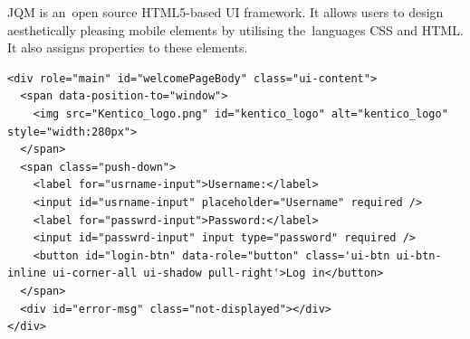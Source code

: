 JQM is an~open source HTML5-based UI framework. It allows users to design aesthetically pleasing mobile elements by utilising the~languages CSS and HTML. It also assigns properties to these elements. 
\lstset{style=sharpc, numbers=left}
\begin{lstlisting}
<div role="main" id="welcomePageBody" class="ui-content">
  <span data-position-to="window">
    <img src="Kentico_logo.png" id="kentico_logo" alt="kentico_logo" style="width:280px">
  </span>
  <span class="push-down">
    <label for="usrname-input">Username:</label>
    <input id="usrname-input" placeholder="Username" required />
    <label for="passwrd-input">Password:</label>
    <input id="passwrd-input" input type="password" required />
    <button id="login-btn" data-role="button" class='ui-btn ui-btn-inline ui-corner-all ui-shadow pull-right'>Log in</button>
  </span>
  <div id="error-msg" class="not-displayed"></div>
</div>
\end{lstlisting}
